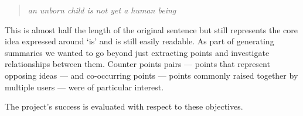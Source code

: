     \medskip
    \begin{center}
    \blockquote{\textit{an unborn child is not yet a human being}}
    \end{center}
    \medskip

    This is almost half the length of the original sentence but still represents the core idea expressed around `is' and is still easily readable. As part of generating summaries we wanted to go beyond just extracting points and investigate relationships between them. Counter points pairs --- points that represent opposing ideas --- and co-occurring points --- points commonly raised together by multiple users --- were of particular interest.

    \medskip

    The project's success is evaluated with respect to these objectives.
